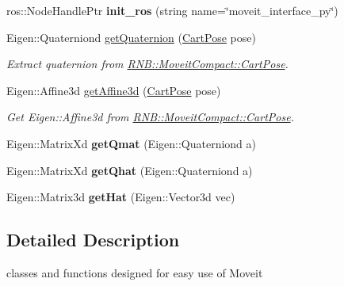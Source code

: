 \begin{DoxyCompactItemize}
\item 
\mbox{\label{namespace_r_n_b_1_1_moveit_compact_a6bef4f8f273f898f25e79f47e98564a1}} 
ros\+::\+Node\+Handle\+Ptr {\bfseries init\+\_\+ros} (string name=\char`\"{}moveit\+\_\+interface\+\_\+py\char`\"{})
\item 
Eigen\+::\+Quaterniond \hyperlink{namespace_r_n_b_1_1_moveit_compact_a54930af2dcdc8fc1cf279e850baf5fba}{get\+Quaternion} (\hyperlink{class_r_n_b_1_1_moveit_compact_1_1_cart_pose}{Cart\+Pose} pose)
\begin{DoxyCompactList}\small\item\em Extract quaternion from \hyperlink{class_r_n_b_1_1_moveit_compact_1_1_cart_pose}{R\+N\+B\+::\+Moveit\+Compact\+::\+Cart\+Pose}. \end{DoxyCompactList}\item 
Eigen\+::\+Affine3d \hyperlink{namespace_r_n_b_1_1_moveit_compact_a7428e08b7f80d96545b3e82eef22d52e}{get\+Affine3d} (\hyperlink{class_r_n_b_1_1_moveit_compact_1_1_cart_pose}{Cart\+Pose} pose)
\begin{DoxyCompactList}\small\item\em Get Eigen\+::\+Affine3d from \hyperlink{class_r_n_b_1_1_moveit_compact_1_1_cart_pose}{R\+N\+B\+::\+Moveit\+Compact\+::\+Cart\+Pose}. \end{DoxyCompactList}\item 
\mbox{\label{namespace_r_n_b_1_1_moveit_compact_a245347a5fd86adfd96f2e3bbd1d576ad}} 
Eigen\+::\+Matrix\+Xd {\bfseries get\+Qmat} (Eigen\+::\+Quaterniond a)
\item 
\mbox{\label{namespace_r_n_b_1_1_moveit_compact_a2f1ab177e91faf3466b9589d36ca03c3}} 
Eigen\+::\+Matrix\+Xd {\bfseries get\+Qhat} (Eigen\+::\+Quaterniond a)
\item 
\mbox{\label{namespace_r_n_b_1_1_moveit_compact_aa19d0d745e3ebea45b025414dd173918}} 
Eigen\+::\+Matrix3d {\bfseries get\+Hat} (Eigen\+::\+Vector3d vec)
\end{DoxyCompactItemize}


\subsection{Detailed Description}
classes and functions designed for easy use of Moveit 

